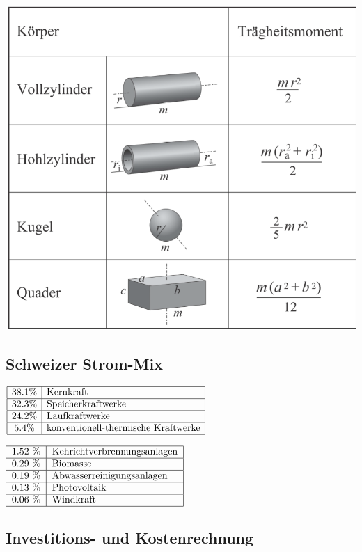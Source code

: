 \\
\includegraphics[width=0.75\linewidth]{images/Physik_1-Mechanik.png}


\subsection{Schweizer Strom-Mix}
$
\begin{array}{|c|l|}
    \hline
    38.1 \% & \text{Kernkraft} \\ \hline
    32.3 \% & \text{Speicherkraftwerke} \\ \hline
    24.2 \% & \text{Laufkraftwerke} \\ \hline
    5.4 \% & \text{konventionell-thermische Kraftwerke} \\ \hline
\end{array}
$

$
\begin{tabular}{|c|l|}
    \hline
    1.52 \% & Kehrichtverbrennungsanlagen \\ \hline
    0.29 \% & Biomasse \\ \hline
    0.19 \% & Abwasserreinigungsanlagen \\ \hline
    0.13 \% & Photovoltaik \\ \hline
    0.06 \% & Windkraft \\ \hline
\end{tabular}
$


\newcolumn
\subsection{Investitions- und Kostenrechnung}

